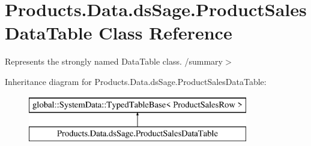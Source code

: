 \hypertarget{class_products_1_1_data_1_1ds_sage_1_1_product_sales_data_table}{}\section{Products.\+Data.\+ds\+Sage.\+Product\+Sales\+Data\+Table Class Reference}
\label{class_products_1_1_data_1_1ds_sage_1_1_product_sales_data_table}


Represents the strongly named Data\+Table class. /summary$>$  


Inheritance diagram for Products.\+Data.\+ds\+Sage.\+Product\+Sales\+Data\+Table\+:\begin{figure}[H]
\begin{center}
\leavevmode
\includegraphics[height=2.000000cm]{class_products_1_1_data_1_1ds_sage_1_1_product_sales_data_table}
\end{center}
\end{figure}
